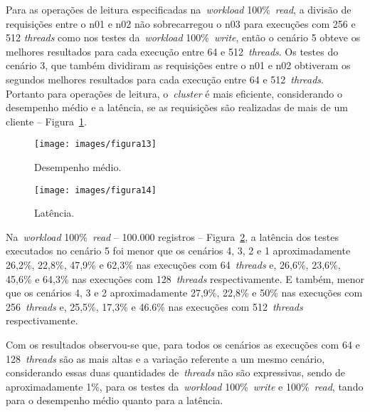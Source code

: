 \documentclass[12pt]{article}
\begin{document}
Para as operações de leitura especificadas na~\emph{workload} 100\%~\emph{read}, a divisão de requisições entre o n01 e n02 não sobrecarregou o n03 para execuções com 256 e 512 \emph{threads} como nos testes da~\emph{workload} 100\%~\emph{write}, então o cenário 5 obteve os melhores resultados para cada execução entre 64 e 512~\emph{threads}. Os testes do cenário 3, que também dividiram as requisições entre o n01 e n02 obtiveram os segundos melhores resultados para cada execução entre 64 e 512~\emph{threads}. Portanto para operações de leitura, o~\emph{cluster} é mais eficiente, considerando o desempenho médio e a latência, se as requisições são realizadas de mais de um cliente -- Figura~\ref{figura13}.

\begin{figure*}
    \centering
    \begin{subfigure}[b]{0.49\textwidth}   
        \centering 
        \texttt{[image: images/figura13]}
        \caption{Desempenho médio.}
        \label{figura13}
    \end{subfigure}
    \begin{subfigure}[b]{0.49\textwidth}   
        \centering 
        \texttt{[image: images/figura14]}
        \caption{Latência.}
        \label{figura14}
    \end{subfigure}
    \caption{\emph{Workload} 100\%~\emph{read} -- 100.000 registros nos cenários de 1 a 5.}
\end{figure*}

Na~\emph{workload} 100\%~\emph{read} -- 100.000 registros -- Figura~\ref{figura14}, a latência dos testes executados no cenário 5 foi menor que os cenários 4, 3, 2 e 1 aproximadamente 26,2\%, 22,8\%, 47,9\% e 62,3\% nas execuções com 64~\emph{threads} e, 26,6\%, 23,6\%, 45,6\% e 64,3\% nas execuções com 128~\emph{threads} respectivamente. E também, menor que os cenários 4, 3 e 2 aproximadamente 27,9\%, 22,8\% e 50\% nas execuções com 256~\emph{threads} e, 25,5\%, 17,3\% e 46.6\% nas execuções com 512~\emph{threads} respectivamente.

Com os resultados observou-se que, para todos os cenários as execuções com 64 e 128~\emph{threads} são as mais altas e a variação referente a um mesmo cenário, considerando essas duas quantidades de~\emph{threads} não são expressivas, sendo de aproximadamente 1\%, para os testes da~\emph{workload} 100\%~\emph{write} e 100\%~\emph{read}, tando para o desempenho médio quanto para a latência.
\end{document}
